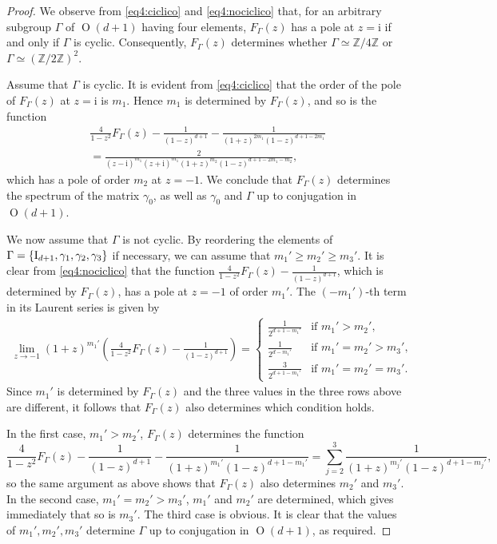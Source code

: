 \documentclass[12pt,a4paper,final]{amsart}
\theoremstyle{plain}
\theoremstyle{definition}
\theoremstyle{remark}
\numberwithin{equation}{section}
\newcommand{\Z}{\mathbb Z}
\DeclareMathOperator{\Ot}{O}
\newcommand{\Id}{\textup{I}}
\newcommand{\mi}{\mathrm{i}}
\begin{document}
\begin{proof}
We observe from \eqref{eq4:ciclico} and \eqref{eq4:nociclico} that, for an arbitrary subgroup $\Gamma$ of $\Ot(d+1)$ having four elements, $F_{\Gamma}(z)$ has a pole at $z=\mi$ if and only if $\Gamma$ is cyclic. 
Consequently, $F_{\Gamma}(z)$ determines whether $\Gamma\simeq\Z/4\Z$ or $\Gamma\simeq (\Z/2\Z)^2$. 

Assume that $\Gamma$ is cyclic. 
It is evident from \eqref{eq4:ciclico} that the order of the pole of $F_{\Gamma}(z)$ at $z=\mi$ is $m_1$.
Hence $m_1$ is determined by $F_{\Gamma}(z)$, and so is the function
\begin{multline*}
\frac{4}{1-z^2}F_{\Gamma}(z)
- \frac{1}{(1-z)^{d+1}}
-\frac{1}{(1+z)^{2m_1}(1-z)^{d+1-2m_1}}
\\ 
=\frac{2}{(z-\mi)^{m_1} (z+\mi)^{m_1} (1+z)^{m_2} (1-z)^{d+1-2m_1-m_2}}
,
\end{multline*}
which has a pole of order $m_2$ at $z=-1$. 
We conclude that $F_{\Gamma}(z)$ determines the spectrum of the matrix $\gamma_0$, as well as $\gamma_0$ and $\Gamma$ up to conjugation in $\Ot(d+1)$. 

We now assume that $\Gamma$ is not cyclic. 
By reordering the elements of $\Gamma=\{\Id_{d+1},\gamma_1,\gamma_2,\gamma_3\}$ if necessary, we can assume that $m_1'\geq m_2'\geq m_3'$. 
It is clear from \eqref{eq4:nociclico} that the function $\frac{4}{1-z^2}F_{\Gamma}(z) - \frac{1}{(1-z)^{d+1}}$, which is determined by $F_{\Gamma}(z)$, has a pole at $z=-1$ of order $m_1'$. 
The $(-m_1')$-th term in its Laurent series is given by 
\begin{align*}
\lim_{z\to-1} (1+z)^{m_1'}\left(\frac{4}{1-z^2}F_{\Gamma}(z) - \frac{1}{(1-z)^{d+1}}\right) 
=
\begin{cases}
\frac1{2^{d+1-m_1'}}
	&\text{if }m_1'>m_2',\\
\frac1{2^{d-m_1'}}
	&\text{if }m_1'=m_2'>m_3',\\
\frac{3}{2^{d+1-m_1'}}
	&\text{if }m_1'=m_2'=m_3'.
\end{cases}
\end{align*}
Since $m_1'$ is determined by $F_{\Gamma}(z)$ and the three values in the three rows above are different, it follows that $F_{\Gamma}(z)$ also determines which condition holds. 


In the first case, $m_1'>m_2'$, $F_{\Gamma}(z)$ determines
the function
$$
\frac{4}{1-z^2}F_{\Gamma}(z)
-\frac{1}{(1-z)^{d+1}}
-
\frac{1}{(1+z)^{m_1'}(1-z)^{d+1-m_1'}}
=\sum_{j=2}^3 \frac{1}{(1+z)^{m_j'}(1-z)^{d+1-m_j'}}
,
$$
so the same argument as above shows that $F_{\Gamma}(z)$ also determines $m_2'$ and $m_3'$.
In the second case, $m_1'=m_2'>m_3'$, $m_1'$ and $m_2'$ are determined, which gives immediately that so is $m_3'$. 
The third case is obvious. 
It is clear that the values of $m_1',m_2',m_3'$ determine $\Gamma$ up to conjugation in $\Ot(d+1)$, as required. 





\end{proof}
\end{document}
